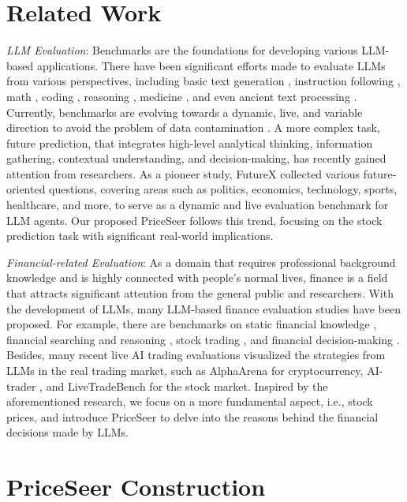 \documentclass[conference]{IEEEtran}
\begin{document}
\section{Related Work}
{\it LLM Evaluation}:
Benchmarks are the foundations for developing various LLM-based applications. There have been significant efforts made to evaluate LLMs from various perspectives, including basic text generation \cite{chiang2024chatbot}, instruction following \cite{zengevaluating}, math \cite{liu2024mathbench}, coding \cite{jainlivecodebench}, reasoning \cite{whitelivebench}, medicine \cite{ji2025medomni}, and even ancient text processing \cite{chen2025obi}.
Currently, benchmarks are evolving towards a dynamic, live, and variable direction to avoid the problem of data contamination \cite{chen2025can,chen2025maceval,chen2025evaluating}.
A more complex task, future prediction, that integrates high-level analytical thinking, information gathering, contextual understanding, and decision-making, has recently gained attention from researchers.
As a pioneer study, FutureX \cite{zeng2025futurex} collected various future-oriented questions, covering areas such as politics, economics, technology, sports, healthcare, and more, to serve as a dynamic and live evaluation benchmark for LLM agents. Our proposed PriceSeer follows this trend, focusing on the stock prediction task with significant real-world implications. 


{\it Financial-related Evaluation}:
As a domain that requires professional background knowledge and is highly connected with people's normal lives, finance is a field that attracts significant attention from the general public and researchers. With the development of LLMs, many LLM-based finance evaluation studies have been proposed. For example, there are benchmarks on static financial knowledge \cite{FinBen}, financial searching and reasoning \cite{FinSearchComp}, stock trading \cite{StockBench}, and financial decision-making \cite{investorbench}. Besides, many recent live AI trading evaluations visualized the strategies from LLMs in the real trading market, such as AlphaArena \cite{AlphaArena} for cryptocurrency, AI-trader \cite{AI-Trader}, and LiveTradeBench \cite{LiveTradeBench} for the stock market. Inspired by the aforementioned research, we focus on a more fundamental aspect, i.e., stock prices, and introduce PriceSeer to delve into the reasons behind the financial decisions made by LLMs.



\section{PriceSeer Construction}
\end{document}
